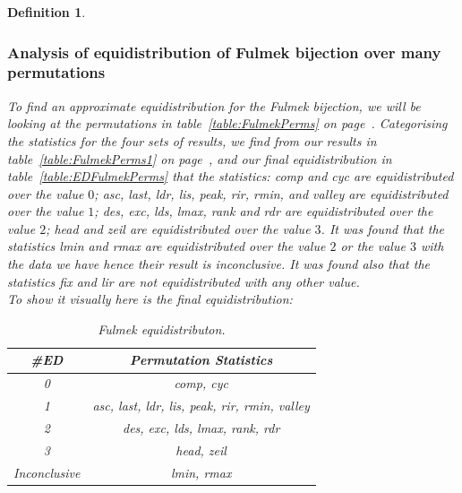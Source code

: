 \documentclass[12pt]{article}
\newtheorem{definition}{Definition}
\begin{document}
\begin{definition}
\subsubsection{Analysis of equidistribution of Fulmek bijection over many permutations}
To find an approximate equidistribution for the Fulmek bijection, we will be looking at the permutations in table~\ref{table:FulmekPerms} on page~\pageref{table:FulmekPerms}. Categorising the statistics for the four sets of results, we find from our results in table~\ref{table:FulmekPerms1} on page~\pageref{table:FulmekPerms1}, and our final equidistribution in table~\ref{table:EDFulmekPerms} that the statistics: comp and cyc are equidistributed over the value $0$; asc, last, ldr, lis, peak, rir, rmin, and valley are equidistributed over the value $1$; des, exc, lds, lmax, rank and rdr are equidistributed over the value $2$; head and zeil are equidistributed over the value $3$. It was found that the statistics lmin and rmax are equidistributed over the value $2$ or the value $3$ with the data we have hence their result is inconclusive. It was found also that the statistics fix and lir are not equidistributed with any other value.\\
To show it visually here is the final equidistribution:
\begin{table}[H]
\caption{Fulmek equidistributon.}
\begin{tabular}{c | c}
\hline\hline
\#ED & Permutation Statistics\\ [0.5ex]
\hline
0 & comp, cyc \\
\hline
1 & asc, last, ldr, lis, peak, rir, rmin, valley  \\
\hline
2 & des, exc, lds, lmax, rank, rdr \\
\hline
3 & head, zeil \\
\hline
Inconclusive & lmin, rmax \\
\hline
\end{tabular}
\label{table:FinalEDFulmek}
\end{table}


\end{definition}
\end{document}
